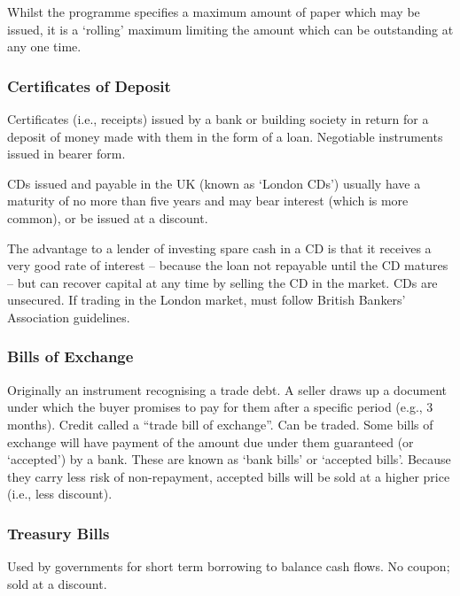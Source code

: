 \documentclass[
]{article}
\begin{document}
Whilst the programme specifies a maximum amount of paper which may be
issued, it is a `rolling' maximum limiting the amount which can be
outstanding at any one time.

\hypertarget{certificates-of-deposit}{%
\subsubsection{Certificates of Deposit}\label{certificates-of-deposit}}

Certificates (i.e., receipts) issued by a bank or building society in
return for a deposit of money made with them in the form of a loan.
Negotiable instruments issued in bearer form.

CDs issued and payable in the UK (known as `London CDs') usually have a
maturity of no more than five years and may bear interest (which is more
common), or be issued at a discount.

The advantage to a lender of investing spare cash in a CD is that it
receives a very good rate of interest -- because the loan not repayable
until the CD matures -- but can recover capital at any time by selling
the CD in the market. CDs are unsecured. If trading in the London
market, must follow British Bankers' Association guidelines.

\hypertarget{bills-of-exchange}{%
\subsubsection{Bills of Exchange}\label{bills-of-exchange}}

Originally an instrument recognising a trade debt. A seller draws up a
document under which the buyer promises to pay for them after a specific
period (e.g., 3 months). Credit called a ``trade bill of exchange''. Can
be traded. Some bills of exchange will have payment of the amount due
under them guaranteed (or `accepted') by a bank. These are known as
`bank bills' or `accepted bills'. Because they carry less risk of
non-repayment, accepted bills will be sold at a higher price (i.e., less
discount).

\hypertarget{treasury-bills}{%
\subsubsection{Treasury Bills}\label{treasury-bills}}

Used by governments for short term borrowing to balance cash flows. No
coupon; sold at a discount.
\end{document}
